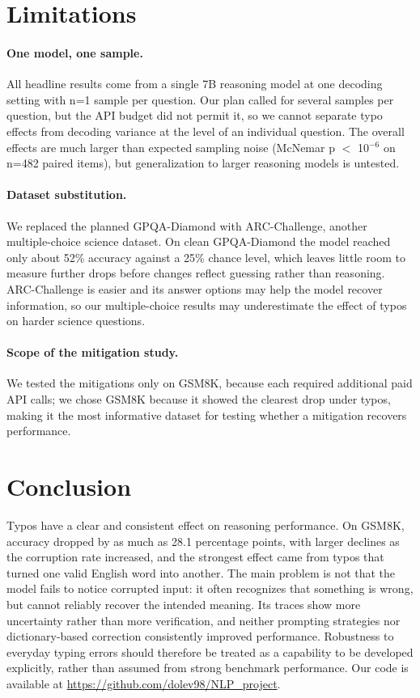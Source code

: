 \documentclass[11pt]{article}
\begin{document}
\section{Limitations}
\paragraph{One model, one sample.} All headline results come from a single 7B reasoning model at one decoding setting with n=1 sample per question. Our plan called for several samples per question, but the API budget did not permit it, so we cannot separate typo effects from decoding variance at the level of an individual question. The overall effects are much larger than expected sampling noise (McNemar p $<$ 10$^{-6}$ on n=482 paired items), but generalization to larger reasoning models is untested.

\paragraph{Dataset substitution.} We replaced the planned GPQA-Diamond \citep{rein2024} with ARC-Challenge, another multiple-choice science dataset. On clean GPQA-Diamond the model reached only about 52\% accuracy against a 25\% chance level, which leaves little room to measure further drops before changes reflect guessing rather than reasoning. ARC-Challenge is easier and its answer options may help the model recover information, so our multiple-choice results may underestimate the effect of typos on harder science questions.

\paragraph{Scope of the mitigation study.} We tested the mitigations only on GSM8K, because each required additional paid API calls; we chose GSM8K because it showed the clearest drop under typos, making it the most informative dataset for testing whether a mitigation recovers performance.

\section{Conclusion}
Typos have a clear and consistent effect on reasoning performance. On GSM8K, accuracy dropped by as much as 28.1 percentage points, with larger declines as the corruption rate increased, and the strongest effect came from typos that turned one valid English word into another. The main problem is not that the model fails to notice corrupted input: it often recognizes that something is wrong, but cannot reliably recover the intended meaning. Its traces show more uncertainty rather than more verification, and neither prompting strategies nor dictionary-based correction consistently improved performance. Robustness to everyday typing errors should therefore be treated as a capability to be developed explicitly, rather than assumed from strong benchmark performance. Our code is available at \url{https://github.com/dolev98/NLP_project}.
\end{document}
